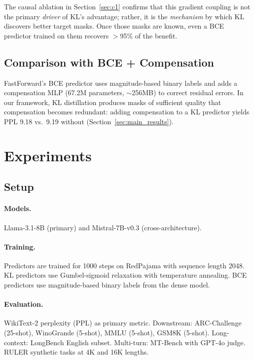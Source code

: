 \documentclass[11pt,a4paper]{article}
\begin{document}
The causal ablation in Section~\ref{sec:c1} confirms that this gradient coupling is not the primary \emph{driver} of KL's advantage; rather, it is the \emph{mechanism} by which KL discovers better target masks. Once those masks are known, even a BCE predictor trained on them recovers $>$95\% of the benefit.

\subsection{Comparison with BCE + Compensation}

FastForward's BCE predictor uses magnitude-based binary labels and adds a compensation MLP (67.2M parameters, ${\sim}$256MB) to correct residual errors. In our framework, KL distillation produces masks of sufficient quality that compensation becomes redundant: adding compensation to a KL predictor yields PPL 9.18 vs.\ 9.19 without (Section~\ref{sec:main_results}).

\section{Experiments}

\subsection{Setup}

\paragraph{Models.} Llama-3.1-8B (primary) and Mistral-7B-v0.3 (cross-architecture).

\paragraph{Training.} Predictors are trained for 1000 steps on RedPajama with sequence length 2048. KL predictors use Gumbel-sigmoid relaxation with temperature annealing. BCE predictors use magnitude-based binary labels from the dense model.

\paragraph{Evaluation.} WikiText-2 perplexity (PPL) as primary metric. Downstream: ARC-Challenge (25-shot), WinoGrande (5-shot), MMLU (5-shot), GSM8K (5-shot). Long-context: LongBench English subset. Multi-turn: MT-Bench with GPT-4o judge. RULER synthetic tasks at 4K and 16K lengths.
\end{document}
